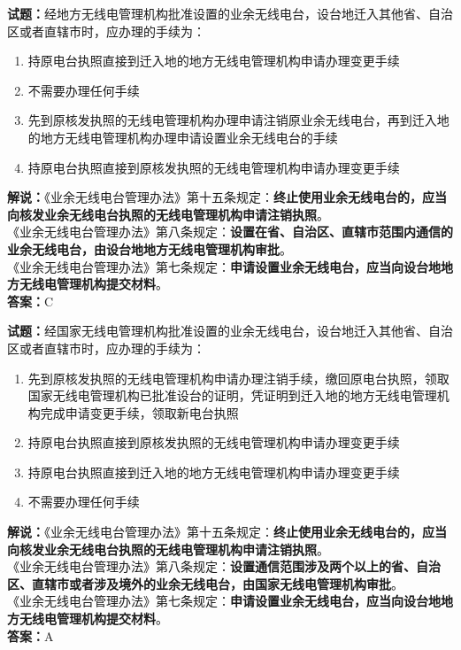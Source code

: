 \documentclass{ctexbook}
\begin{document}
\noindent\textbf{试题：}经地方无线电管理机构批准设置的业余无线电台，设台地迁入其他省、自治区或者直辖市时，应办理的手续为：
\begin{enumerate}[leftmargin=3em]
  \item 持原电台执照直接到迁入地的地方无线电管理机构申请办理变更手续
  \item 不需要办理任何手续
  \item 先到原核发执照的无线电管理机构办理申请注销原业余无线电台，再到迁入地的地方无线电管理机构办理申请设置业余无线电台的手续
  \item 持原电台执照直接到原核发执照的无线电管理机构申请办理变更手续
\end{enumerate}
\noindent\textbf{解说：}《业余无线电台管理办法》第十五条规定：\textbf{终止使用业余无线电台的，应当向核发业余无线电台执照的无线电管理机构申请注销执照}。\\
《业余无线电台管理办法》第八条规定：\textbf{设置在省、自治区、直辖市范围内通信的业余无线电台，由设台地地方无线电管理机构审批}。\\
《业余无线电台管理办法》第七条规定：\textbf{申请设置业余无线电台，应当向设台地地方无线电管理机构提交材料}。\\\noindent\textbf{答案：}C

\vspace{\baselineskip}

\noindent\textbf{试题：}经国家无线电管理机构批准设置的业余无线电台，设台地迁入其他省、自治区或者直辖市时，应办理的手续为：
\begin{enumerate}[leftmargin=3em]
  \item 先到原核发执照的无线电管理机构申请办理注销手续，缴回原电台执照，领取国家无线电管理机构已批准设台的证明，凭证明到迁入地的地方无线电管理机构完成申请变更手续，领取新电台执照
  \item 持原电台执照直接到原核发执照的无线电管理机构申请办理变更手续
  \item 持原电台执照直接到迁入地的地方无线电管理机构申请办理变更手续
  \item 不需要办理任何手续
\end{enumerate}
\noindent\textbf{解说：}《业余无线电台管理办法》第十五条规定：\textbf{终止使用业余无线电台的，应当向核发业余无线电台执照的无线电管理机构申请注销执照}。\\
《业余无线电台管理办法》第八条规定：\textbf{设置通信范围涉及两个以上的省、自治区、直辖市或者涉及境外的业余无线电台，由国家无线电管理机构审批}。\\
《业余无线电台管理办法》第七条规定：\textbf{申请设置业余无线电台，应当向设台地地方无线电管理机构提交材料}。\\\noindent\textbf{答案：}A
\end{document}
